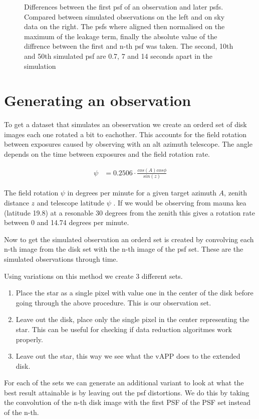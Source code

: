 \begin{figure}[h!]
  \caption{Differences between the first psf of an observation and later psfs. Compared between simulated observations on the left and on sky data on the right. The psfs where aligned then normalised on the maximum of the leakage term, finally the absolute value of the diffrence between the first and n-th psf was taken. The second, 10th and 50th simulated psf are 0.7, 7 and 14 seconds apart in the simulation}
  \label{fig:psfs_evolving}
\end{figure}






\section{Generating an observation}
\label{sec:gen}
To get a dataset that simulates an obeservation we create an orderd set of disk images each one rotated a bit to eachother. This accounts for the field rotation between exposures caused by observing with an alt azimuth telescope. The angle depends on the time between exposures and the field rotation rate.

\begin{align}
  \psi &= 0.2506 \cdot \frac{cos(A) cos \phi}{sin(z)} 
\end{align}

The field rotation $\psi$ in degrees per minute for a given target azimuth $A$, zenith distance $z$ and telescope latitude $\psi$ \cite[page 95]{Electronic_imaging}. If we would be observing from mauna kea (latitude 19.8) at a resonable 30 degrees from the zenith this gives a rotation rate between 0 and  14.74 degrees per minute.

Now to get the simulated observation an orderd set is created by convolving each n-th image from the disk set with the n-th image of the psf set. These are the simulated observations through time. 

Using variations on this method we create 3 different sets.

\begin{enumerate}
\item Place the star as a single pixel with value one in the center of the disk before going through the above procedure. This is our observation set.
\item Leave out the disk, place only the single pixel in the center representing the star. This can be useful for checking if data reduction algoritmes work properly.
\item Leave out the star, this way we see what the \ac{vAPP} does to the extended disk.
\end{enumerate}

For each of the sets we can generate an additional variant to look at what the best result attainable is by leaving out the psf distortions. We do this by taking the convolution of the n-th disk image with the first \ac{PSF} of the \ac{PSF} set instead of the n-th.
